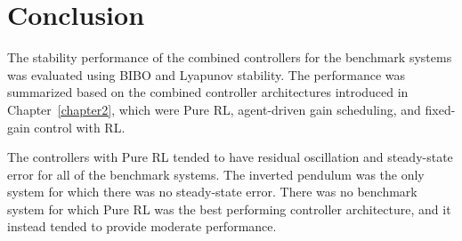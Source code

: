



\section{Conclusion}

The stability performance of the combined controllers for the benchmark systems was evaluated using BIBO and Lyapunov stability. The performance was summarized based on the combined controller architectures introduced in Chapter~\ref{chapter2}, which were Pure RL, agent-driven gain scheduling, and fixed-gain control with RL.

The controllers with Pure RL tended to have residual oscillation and steady-state error for all of the benchmark systems. The inverted pendulum was the only system for which there was no steady-state error. There was no benchmark system for which Pure RL was the best performing controller architecture, and it instead tended to provide moderate performance.

